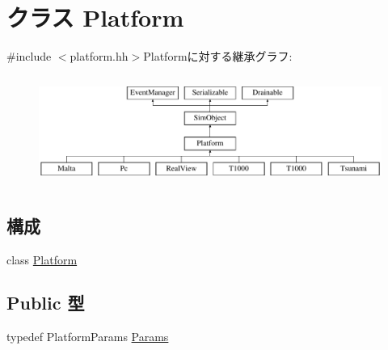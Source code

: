 \hypertarget{classPlatform}{
\section{クラス Platform}
\label{classPlatform}
}


{\ttfamily \#include $<$platform.hh$>$}Platformに対する継承グラフ:\begin{figure}[H]
\begin{center}
\leavevmode
\includegraphics[height=3.6246cm]{classPlatform}
\end{center}
\end{figure}
\subsection*{構成}
\begin{DoxyCompactItemize}
\item 
class \hyperlink{classPlatform_1_1Platform}{Platform}
\end{DoxyCompactItemize}
\subsection*{Public 型}
\begin{DoxyCompactItemize}
\item 
typedef PlatformParams \hyperlink{classPlatform_af4e77eaf2602e4808deef7d1ba95e579}{Params}
\end{DoxyCompactItemize}
